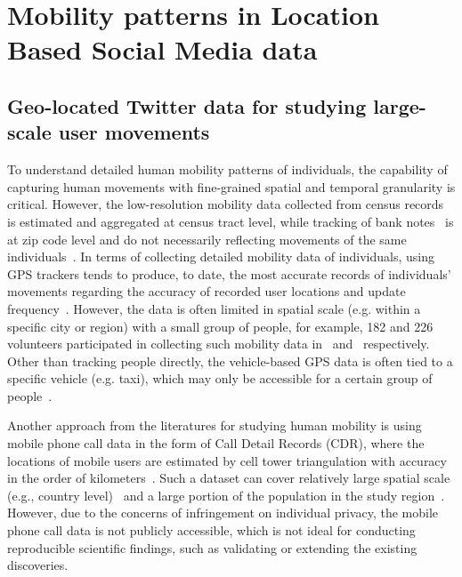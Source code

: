\documentclass[a4paper, 11pt]{article}
\begin{document}
\section{Mobility patterns in Location Based Social Media data}
\subsection{Geo-located Twitter data for studying large-scale user movements}
To understand detailed human mobility patterns of individuals, the capability of capturing human movements with fine-grained spatial and temporal granularity is critical.
However, the low-resolution mobility data collected from census records~\citep{greenwood1985human} is estimated and aggregated at census tract level, while tracking of bank notes~\citep{brockmann2006scaling} is at zip code level and do not necessarily reflecting movements of the same individuals~\citep{gonzalez2008understanding}.
In terms of collecting detailed mobility data of individuals, using GPS trackers tends to produce, to date, the most accurate records of individuals' movements regarding the accuracy of recorded user locations and update frequency~\citep{zheng2008understanding}. However, the data is often limited in spatial scale (e.g. within a specific city or region) with a small group of people, for example, 182 and 226 volunteers participated in collecting such mobility data in~\citep{zheng2010geolife} and~\citep{rhee2011levy} respectively. Other than tracking people directly, the vehicle-based GPS data is often tied to a specific vehicle (e.g. taxi), which may only be accessible for a certain group of people~\citep{kung2014exploring}. 

Another approach from the literatures for studying human mobility is using mobile phone call data in the form of Call Detail Records (CDR), where the locations of mobile users are estimated by cell tower triangulation with accuracy in the order of kilometers~\citep{gonzalez2008understanding,sevtsuk2010does,kung2014exploring}. 
Such a dataset can cover relatively large spatial scale (e.g., country level)~\citep{becker2013human,sobolevsky2013delineating} and a large portion of the population in the study region~\citep{kung2014exploring}. However, due to the concerns of infringement on individual privacy, the mobile phone call data is not publicly accessible, which is not ideal  for conducting reproducible scientific findings, such as validating or extending the existing discoveries.
\end{document}

